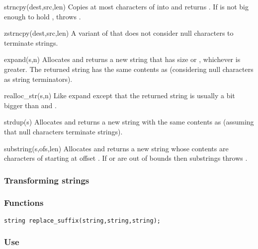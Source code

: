 \begin{defun}{strncpy}{(dest,src,len)}
Copies at most  characters of  into  and
returns .  If  is not big enough to hold
,  throws
.
\end{defun}

\begin{defun}{zstrncpy}{(dest,src,len)}
A variant of  that does not consider null characters to
terminate strings.
\end{defun}

\begin{defun}{expand}{(s,n)}
Allocates and returns a new string that has size  or
, whichever is greater.  The returned string has
the same contents as  (considering null characters as string
terminators).
\end{defun}

\begin{defun}{realloc_str}{(s,n)}
Like expand except that the returned string is usually a bit bigger than
 and .
\end{defun}

\begin{defun}{strdup}{(s)}
Allocates and returns a new string with the same contents as 
(assuming that null characters terminate strings).
\end{defun}

\begin{defun}{substring}{(s,ofs,len)}
Allocates and returns a new string whose contents are 
characters of  starting at offset .  If  or
 are out of bounds then substrings throws
.
\end{defun}

\subsubsection*{Transforming strings}
\subsubsection*{Functions}
\begin{verbatim}
string replace_suffix(string,string,string);
\end{verbatim}

\subsubsection*{Use}

